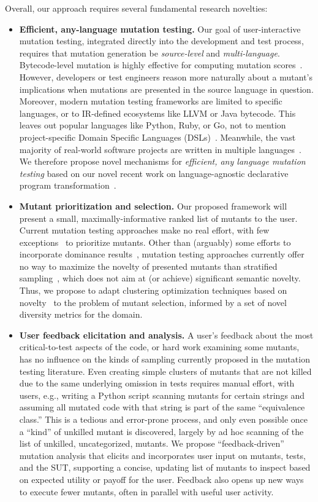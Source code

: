 Overall, our approach requires several fundamental research novelties:
\begin{itemize}[labelsep=3pt,leftmargin=12pt]
\item \textbf{Efficient, any-language mutation testing.}
Our goal of user-interactive mutation testing, integrated directly into
the development and test process, requires that mutation generation be
\emph{source-level} and \emph{multi-language}.
Bytecode-level mutation is highly effective for computing
mutation scores~\cite{pittest,HaririLLVM}.  However, developers or test
engineers reason more naturally about a mutant's implications when mutations
are presented in the source language in question.  Moreover, modern mutation
testing frameworks are limited to specific languages, or to IR-defined
ecosystems like LLVM or Java bytecode.  This leaves out popular languages like Python, Ruby, or Go, not
to mention project-specific Domain Specific Languages (DSLs)~\cite{Fow10}.
Meanwhile, the vast majority of
real-world software projects are written in multiple languages~\cite{Ray2014}.
We therefore propose novel mechanisms for \emph{efficient, any language mutation
  testing} based on our novel recent work on language-agnostic declarative
program transformation~\cite{rvt-ppc}.
\item \textbf{Mutant prioritization and selection.}  Our
  proposed framework will present a small, maximally-informative ranked list of
  mutants to the user.
Current mutation testing approaches make
no real effort, with few exceptions~\cite{MutGoogle,FaRM} to prioritize mutants.
Other than (arguably) some efforts to
incorporate dominance results~\cite{MutQuality}, mutation testing approaches
currently offer no way to maximize the novelty of presented
mutants than stratified sampling~\cite{gopinath2017mutation}, which
does not aim at (or achieve) significant semantic novelty.  Thus,
we propose to adapt clustering optimization techniques based on 
novelty~\cite{Gonzalez85} to the problem of mutant selection, informed by a set
of novel diversity metrics for the domain.
\item \textbf{User feedback elicitation and analysis.}
A
user's feedback about the most critical-to-test aspects of the code, or hard
work examining some mutants, has no influence on the kinds of sampling currently
proposed in the mutation testing literature.
Even creating simple clusters of
mutants that are not killed due to the same underlying omission in tests
requires manual effort, with users, e.g., writing a Python script scanning
mutants for certain strings and assuming all mutated code with that string is
part of the same ``equivalence class.''  This is a tedious and error-prone
process, and only even possible once a ``kind'' of unkilled mutant is
discovered, largely by ad hoc scanning of the list of unkilled, uncategorized,
mutants.
We propose ``feedback-driven'' mutation analysis that elicits and incorporates
user input on mutants, tests, and the SUT, supporting a concise, updating list
of mutants to inspect based on expected utility or payoff for the
user.  Feedback also opens up new ways to execute fewer mutants, 
often in parallel with useful user activity.
\end{itemize}

